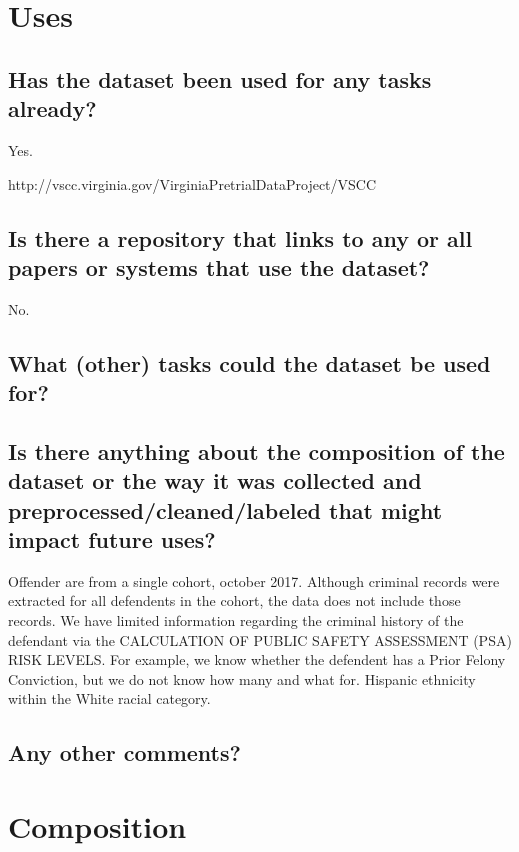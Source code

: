 \documentclass[letterpaper, 10 pt, conference]{ieeeconf}  %
\begin{document}
\section{Uses}

\subsection{Has the dataset been used for any tasks already?}

Yes. 

http://vscc.virginia.gov/VirginiaPretrialDataProject/VSCC%




\subsection{Is there a repository that links to any or all papers or systems that use the dataset?}

No.

\subsection{What (other) tasks could the dataset be used for?}



\subsection{Is there anything about the composition of the dataset or the way it was collected and preprocessed/cleaned/labeled that might impact future uses?}

Offender are from a single cohort, october 2017.
Although criminal records were extracted for all defendents in the cohort, the data does not include those records. We have limited information regarding the criminal history of the defendant via the CALCULATION OF PUBLIC SAFETY ASSESSMENT (PSA) RISK LEVELS. For example, we know whether the defendent has a Prior Felony Conviction, but we do not know how many and what for. 
Hispanic ethnicity within the White racial category.

\subsection{Any other comments?}

\lipsum[1]

\section{Composition}
\end{document}
